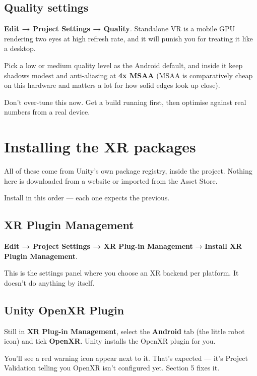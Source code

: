 \documentclass[11pt,a4paper]{article}
\begin{document}
\subsection{Quality settings}\label{quality-settings}

\textbf{Edit → Project Settings → Quality}. Standalone VR is a mobile GPU rendering two eyes
at high refresh rate, and it will punish you for treating it like a desktop.

Pick a low or medium quality level as the Android default, and inside it keep shadows
modest and anti-aliasing at \textbf{4x MSAA} (MSAA is comparatively cheap on this hardware and
matters a lot for how solid edges look up close).

Don't over-tune this now. Get a build running first, then optimise against real numbers
from a real device.


\section{Installing the XR packages}\label{installing-the-xr-packages}

All of these come from Unity's own package registry, inside the project. Nothing here is
downloaded from a website or imported from the Asset Store.

Install in this order --- each one expects the previous.

\subsection{XR Plugin Management}\label{xr-plugin-management}

\textbf{Edit → Project Settings → XR Plug-in Management} → \textbf{Install XR Plugin Management}.

This is the settings panel where you choose an XR backend per platform. It doesn't do
anything by itself.

\subsection{Unity OpenXR Plugin}\label{unity-openxr-plugin}

Still in \textbf{XR Plug-in Management}, select the \textbf{Android} tab (the little robot icon) and
tick \textbf{OpenXR}. Unity installs the OpenXR plugin for you.

You'll see a red warning icon appear next to it. That's expected --- it's Project Validation
telling you OpenXR isn't configured yet. Section 5 fixes it.
\end{document}
